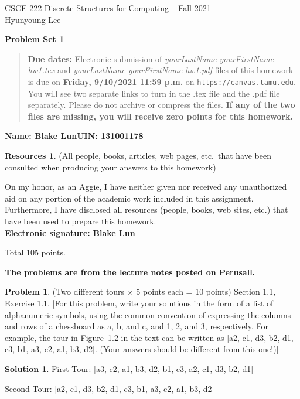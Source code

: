 \documentclass{article}
\theoremstyle{definition}
\newtheorem{problem}{Problem}
\newtheorem*{solution}{Solution}
\newtheorem*{resources}{Resources}
\newcommand{\name}[2]{\noindent\textbf{Name: Blake Lun}\hfill \textbf{UIN: 131001178}}
\newcommand{\honor}{\noindent On my honor, as an Aggie, I have neither
  given nor received any unauthorized aid on any portion of the
  academic work included in this assignment. Furthermore, I have
  disclosed all resources (people, books, web sites, etc.) that have
  been used to prepare this homework. \\[2ex]
 \textbf{Electronic signature:} \underline{ \textbf{Blake Lun} } }
\newcommand{\problemset}[1]{\begin{center}\textbf{Problem Set #1}\end{center}}
\newcommand{\duedate}[1]{\begin{quote}\textbf{Due dates:} Electronic
    submission of \textsl{yourLastName-yourFirstName-hw1.tex} and 
    \textsl{yourLastName-yourFirstName-hw1.pdf} files of this homework is due on
    \textbf{#1} on \texttt{https://canvas.tamu.edu}. You will see two separate links
    to turn in the .tex file and the .pdf file separately. Please do not archive or compress the files.  
    \textbf{If any of the two files are missing, you will receive zero points for this homework.}\end{quote} }
\begin{document}
\vspace*{-20mm}
\begin{center}
{\large
CSCE 222 Discrete Structures for Computing -- Fall 2021\\[.5ex]
Hyunyoung Lee\\}
\end{center}
\problemset{1}
\duedate{Friday, 9/10/2021 11:59 p.m.}
\name{ (type your name here) }{ (type your UIN here) }
\begin{resources} (All people, books, articles, web pages, etc.\ that
  have been consulted when producing your answers to this homework)
\end{resources}
\honor

\bigskip

\noindent
Total 105 points.

\bigskip

\noindent
\textbf{The problems are from the lecture notes posted on Perusall.}

\medskip

\begin{problem} (Two different tours $\times$ 5 points each = 10 points) Section 1.1, Exercise 1.1.
[For this problem, write your solutions in the form of a list of alphanumeric symbols, 
using the common convention of expressing the columns and rows of
a chessboard as a, b, and c, and 1, 2, and 3, respectively. For example, 
the tour in Figure~1.2 in the text can be written as 
[a2, c1, d3, b2, d1, c3, b1, a3, c2, a1, b3, d2].  
(Your answers should be different from this one!)]
\end{problem}
\begin{solution}
First Tour: [a3, c2, a1, b3, d2, b1, c3, a2, c1, d3, b2, d1]

Second Tour: [a2, c1, d3, b2, d1, c3, b1, a3, c2, a1, b3, d2]
\end{solution}
\end{document}

